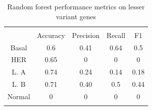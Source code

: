 \documentclass[journal]{IEEEtran}
\begin{document}
\begin{table}[!ht]
    \centering
    \begin{tabular}{c|cccc}
    \multicolumn{1}{c}{} \\
        & Accuracy & Precision & Recall & F1 \\ 
        \cline{1-5}
        Basal & 0.6 & 0.41 & 0.64 & 0.5 \\
        HER & 0.65 & 0 & 0 & 0 \\ 
        L. A & 0.74 & 0.24 & 0.14 & 0.18 \\ 
        L. B & 0.71 & 0.40 & 0.5 & 0.44 \\ 
        Normal & 0 & 0 & 0 & 0 \\ 
        \hline \\
    \end{tabular}
    \caption{Random forest performance metrics on lesser variant genes} \label{Table:perf_test_rf_less_variant}
\end{table}

%
\end{document}
